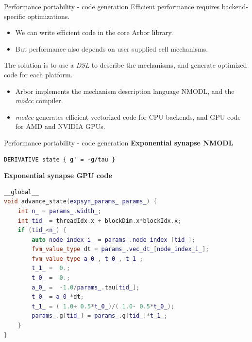 \documentclass[aspectratio=43]{beamer}
\newcommand{\arbor}{{\ttfamily Arbor}\xspace}
\begin{document}
\begin{frame}[fragile]{Performance portability - code generation}
    Efficient performance requires backend-specific optimizations. 
    \begin{itemize}
        \item We can write efficient code in the core \arbor library.
        \item But performance also depends on user supplied cell mechanisms. 
    \end{itemize} 
    \vspace{5pt}
    The solution is to use a \emph{DSL} to describe the mechanisms, and generate optimized code for each platform.\\
    \begin{itemize}
        \item \arbor implements the mechanism description language NMODL, and the \emph{modcc} compiler.
        \item \emph{modcc} generates efficient vectorized code for CPU backends, and GPU code for AMD and NVIDIA GPUs.
    \end{itemize} 
\end{frame}

\begin{frame}[fragile]{Performance portability - code generation}
\textbf{\small Exponential synapse NMODL}
\begin{lstlisting}[style=talkpseudo, backgroundcolor=\color{reallylightgray}]
DERIVATIVE state { g' = -g/tau }
\end{lstlisting}

\vspace{10pt}

\textbf{\small Exponential synapse GPU code}
\begin{lstlisting}[backgroundcolor=\color{reallylightgray},
                   language=C++,
                   basicstyle=\scriptsize,
                   identifierstyle=\color{blue}\scriptsize,
                   emph={threadIdx, blockDim, blockIdx, __global__},
                   emphstyle={\color{darkgreen}},
                   keywordstyle=\color{purple}\scriptsize]
__global__
void advance_state(expsyn_params_ params_) {
    int n_ = params_.width_;
    int tid_ = threadIdx.x + blockDim.x*blockIdx.x;
    if (tid_<n_) {
        auto node_index_i_ = params_.node_index_[tid_];
        fvm_value_type dt = params_.vec_dt_[node_index_i_];
        fvm_value_type a_0_, t_0_, t_1_;
        t_1_ =  0.;
        t_0_ =  0.;
        a_0_ =  -1.0/params_.tau[tid_];
        t_0_ = a_0_*dt;
        t_1_ = ( 1.0+ 0.5*t_0_)/( 1.0- 0.5*t_0_);
        params_.g[tid_] = params_.g[tid_]*t_1_;
    }
}
\end{lstlisting}
\end{frame}
\end{document}
